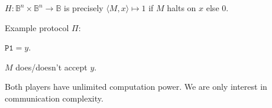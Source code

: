 \begin{example}[$A_{TM}$]
\(H : \mathbb{B}^n \times \mathbb{B}^n \to \mathbb{B}\)
is precisely
\(\langle M, x \rangle \mapsto 1\)
if $M$ halts on $x$ else 0.
\end{example}
\pause
Example protocol $\Pi$:\\
\begin{rightbubbles}
{\footnotesize $\texttt{P1}=y$.}
\end{rightbubbles}
\pause
\begin{leftbubbles}
$M$ does/doesn't accept $y$.
\end{leftbubbles}
\pause
Both players have unlimited computation power.
We are only interest in communication complexity.